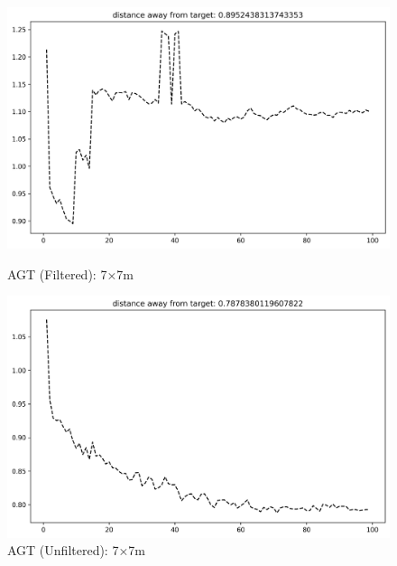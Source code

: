 \documentclass[runningheads]{llncs}
\begin{document}
\begin{figure}[H]
	\centering
	\begin{minipage}{0.49\textwidth}
		\centering
		\includegraphics[width=\textwidth]{figures/filtered/xgb_softmax_custom_7.png}
		\caption*{AGT (Filtered): 7×7m}
	\end{minipage}
	\hfill
	\begin{minipage}{0.49\textwidth}
		\centering
		\includegraphics[width=\textwidth]{figures/unfiltered/xgb_softmax_custom_7.png}
		\caption*{AGT (Unfiltered): 7×7m}
	\end{minipage}
\end{figure}
\end{document}
